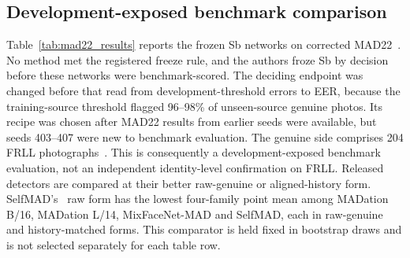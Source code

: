     \subsection{Development-exposed benchmark comparison}
    \label{sec:mad22_results}
    Table~\ref{tab:mad22_results} reports the frozen Sb networks on corrected MAD22~\cite{huber2022synmad}. No method met the registered freeze rule, and the authors froze Sb by decision before these networks were benchmark-scored. The deciding endpoint was changed before that read from development-threshold errors to EER, because the training-source threshold flagged 96--98\% of unseen-source genuine photos. Its recipe was chosen after MAD22 results from earlier seeds were available, but seeds 403--407 were new to benchmark evaluation. The genuine side comprises 204 FRLL photographs~\cite{debruine2017frll}. This is consequently a development-exposed benchmark evaluation, not an independent identity-level confirmation on FRLL. Released detectors are compared at their better raw-genuine or aligned-history form. SelfMAD's~\cite{ivanovska2025selfmad} raw form has the lowest four-family point mean among MADation B/16, MADation L/14, MixFaceNet-MAD and SelfMAD, each in raw-genuine and history-matched forms. This comparator is held fixed in bootstrap draws and is not selected separately for each table row.
    
